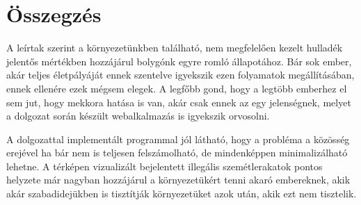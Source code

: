 \chapter{Összegzés}
\label{ch:sum}

A leírtak szerint a környezetünkben található, nem megfelelően kezelt hulladék jelentős mértékben hozzájárul bolygónk egyre romló állapotához. Bár sok ember, akár teljes életpályáját ennek szentelve igyekszik ezen folyamatok megállításában, ennek ellenére ezek mégsem elegek. A legfőbb gond, hogy a legtöbb emberhez el sem jut, hogy mekkora hatása is van, akár csak ennek az egy jelenségnek, melyet a dolgozat során készült webalkalmazás is igyekszik orvosolni.\par
A dolgozattal implementált programmal jól látható, hogy a probléma a közösség erejével ha bár nem is teljesen felszámolható, de mindenképpen minimalizálható lehetne. A térképen vizualizált bejelentett illegális szemétlerakatok pontos helyzete már nagyban hozzájárul a környezetükért tenni akaró embereknek, akik akár szabadidejükben is tisztítják környezetüket azok után, akik ezt nem tisztelik.